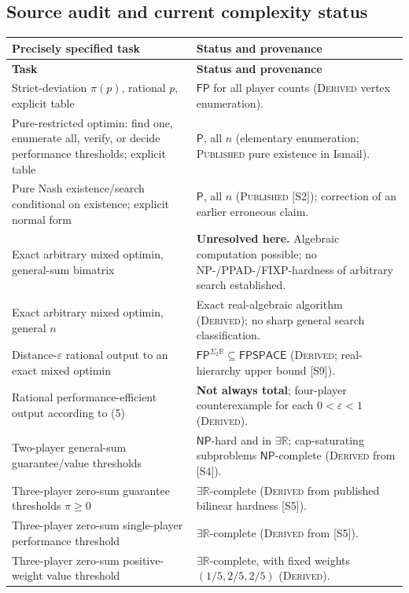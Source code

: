 \documentclass[11pt,a4paper]{article}
\providecommand{\ER}{\exists\mathbb R}
\providecommand{\NP}{\mathsf{NP}}
\providecommand{\FP}{\mathsf{FP}}
\providecommand{\Ptime}{\mathsf{P}}
\begin{document}
\subsection*{Source audit and current complexity status}\label{optimin:sec:results}
\small
\begin{longtable}{p{}p{}}
\toprule
\textbf{Precisely specified task} & \textbf{Status and provenance}\\\midrule
\endfirsthead
\toprule\textbf{Task} & \textbf{Status and provenance}\\\midrule\endhead
Strict-deviation $\pi(p)$, rational $p$, explicit table & $\FP$ for all player counts (\textsc{Derived} vertex enumeration).\\
Pure-restricted optimin: find one, enumerate all, verify, or decide performance thresholds; explicit table & $\Ptime$, all $n$ (elementary enumeration; \textsc{Published} pure existence in Ismail).\\
Pure Nash existence/search conditional on existence; explicit normal form & $\Ptime$, all $n$ (\textsc{Published} [S2]); correction of an earlier erroneous claim.\\
Exact arbitrary mixed optimin, general-sum bimatrix & \textbf{Unresolved here.} Algebraic computation possible; no NP-/PPAD-/FIXP-hardness of arbitrary search established.\\
Exact arbitrary mixed optimin, general $n$ & Exact real-algebraic algorithm (\textsc{Derived}); no sharp general search classification.\\
Distance-$\varepsilon$ rational output to an exact mixed optimin & $\FP^{\Sigma_2\mathbb R}\subseteq\mathsf{FPSPACE}$ (\textsc{Derived}; real-hierarchy upper bound [S9]).\\
Rational performance-efficient output according to (5) & \textbf{Not always total}; four-player counterexample for each $0<\varepsilon<1$ (\textsc{Derived}).\\
Two-player general-sum guarantee/value thresholds & $\NP$-hard and in $\ER$; cap-saturating subproblems $\NP$-complete (\textsc{Derived} from [S4]).\\
Three-player zero-sum guarantee thresholds $\pi\ge0$ & $\ER$-complete (\textsc{Derived} from published bilinear hardness [S5]).\\
Three-player zero-sum single-player performance threshold & $\ER$-complete (\textsc{Derived} from [S5]).\\
Three-player zero-sum positive-weight value threshold & $\ER$-complete, with fixed weights $(1/5,2/5,2/5)$ (\textsc{Derived}).\\

\end{longtable}
\end{document}
